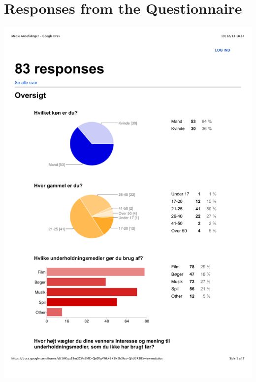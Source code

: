 \section*{Responses from the Questionnaire}
\includegraphics[page=1, scale=0.75]{Appendix/MedieAnbefalingerA.pdf}
\newpage
